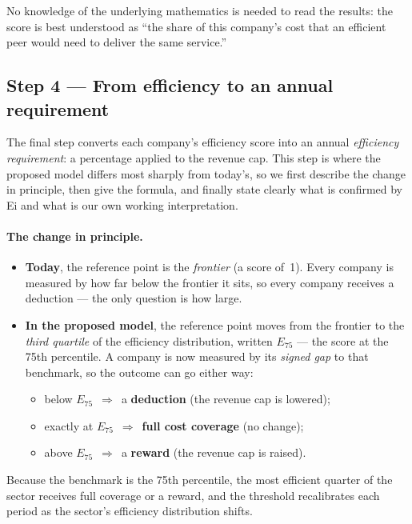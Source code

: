 No knowledge of the underlying mathematics is needed to read the results: the
score is best understood as ``the share of this company's cost that an efficient
peer would need to deliver the same service.''


\subsection{Step 4 --- From efficiency to an annual requirement}
\label{sec:step4}

The final step converts each company's efficiency score into an annual
\emph{efficiency requirement}: a percentage applied to the revenue cap. This step
is where the proposed model differs most sharply from today's, so we first describe
the change in principle, then give the formula, and finally state clearly what is
confirmed by Ei and what is our own working interpretation.

\paragraph{The change in principle.}
\begin{itemize}
  \item \textbf{Today}, the reference point is the \emph{frontier} (a score
        of~1). Every company is measured by how far below the frontier it sits, so
        every company receives a deduction --- the only question is how large.
  \item \textbf{In the proposed model}, the reference point moves from the
        frontier to the \emph{third quartile} of the efficiency distribution,
        written $E_{75}$ --- the score at the 75th percentile. A company is now
        measured by its \emph{signed gap} to that benchmark, so the outcome can go
        either way:
        \begin{itemize}
          \item below $E_{75}$ \,$\Rightarrow$\, a \textbf{deduction} (the revenue
                cap is lowered);
          \item exactly at $E_{75}$ \,$\Rightarrow$\, \textbf{full cost coverage}
                (no change);
          \item above $E_{75}$ \,$\Rightarrow$\, a \textbf{reward} (the revenue
                cap is raised).
        \end{itemize}
\end{itemize}
Because the benchmark is the 75th percentile, the most efficient quarter of the
sector receives full coverage or a reward, and the threshold recalibrates each
period as the sector's efficiency distribution shifts.

